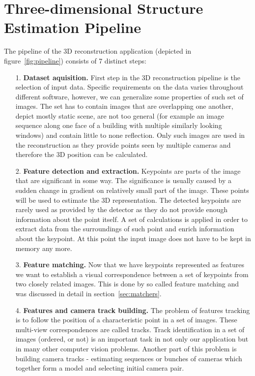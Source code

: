 \section{Three-dimensional Structure Estimation Pipeline}
\label{sec:pipeline}
The pipeline of the 3D reconstruction application (depicted in figure~\ref{fig:pipeline}) consists of 7 distinct steps:
\begin{itemize}
	\item[1.] \textbf{Dataset aquisition.} First step in the 3D reconstruction pipeline is the selection of input data. Specific requirements on the data varies throughout different software, however, we can generalize some properties of such set of images. The set has to contain images that are overlapping one another, depict mostly static scene, are not too general (for example an image sequence along one face of a building with multiple similarly looking windows) and contain little to none reflection. Only such images are used in the reconstruction as they provide points seen by multiple cameras and therefore the 3D position can be calculated.
	\item[2.] \textbf{Feature detection and extraction.} Keypoints are parts of the image that are significant in some way. The significance is usually caused by a sudden change in gradient on relatively small part of the image. These points will be used to estimate the 3D representation. The detected keypoints are rarely used as provided by the detector as they do not provide enough information about the point itself. A set of calculations is applied in order to extract data from the surroundings of such point and enrich information about the keypoint. At this point the input image does not have to be kept in memory any more.
	\item[3.] \textbf{Feature matching.} Now that we have keypoints represented as features we want to establish a visual correspondence between a set of keypoints from two closely related images. This is done by so called feature matching and was discussed in detail in section~\ref{sec:matchers}.
	\item[4.] \textbf{Features and camera track building.} The problem of features tracking is to follow the position of a characteristic point in a set of images. These multi-view correspondences are called tracks. Track identification in a set of images (ordered, or not) is an important task in not only our application but in many other computer vision problems. Another part of this problem is building camera tracks - estimating sequences or bunches of cameras which together form a model and selecting initial camera pair.

\end{itemize}
